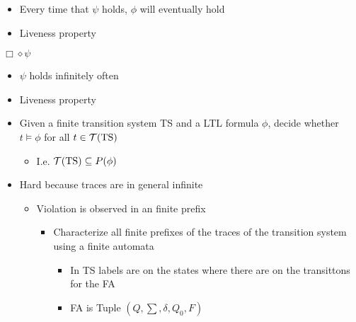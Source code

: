 \begin{itemize}
\begin{itemize}
\begin{itemize}
\begin{itemize}
                                \begin{itemize}
                                    \item Every time that $\psi$ holds, $\phi$ will eventually hold
                                    \item Liveness property
                                \end{itemize}
                             $\Box \diamond \psi$
                                \begin{itemize}
                                    \item $\psi$ holds infinitely often
                                    \item Liveness property
                                \end{itemize}
                        \end{itemize}
                \end{itemize}
                \begin{itemize}
                    \item Given a finite transition system TS and a LTL formula $\phi$, decide whether $t \models \phi$ for all $t \in \mathcal{T}(\text{TS})$
                        \begin{itemize}
                            \item I.e. $\mathcal{T}(\text{TS}) \subseteq P(\phi)$
                        \end{itemize}
                    \item Hard because traces are in general infinite
                        \begin{itemize}
                            \item Violation is observed in an finite prefix
                                \begin{itemize}
                                    \item Characterize all finite prefixes of the traces of the transition system using a finite automata
                                        \begin{itemize}
                                            \item In TS labels are on the states where there are on the transittons for the FA
                                            \item FA is Tuple $(Q, \sum, \delta, Q_0, F)$

\end{itemize}
\end{itemize}
\end{itemize}
\end{itemize}
\end{itemize}
\end{itemize}
